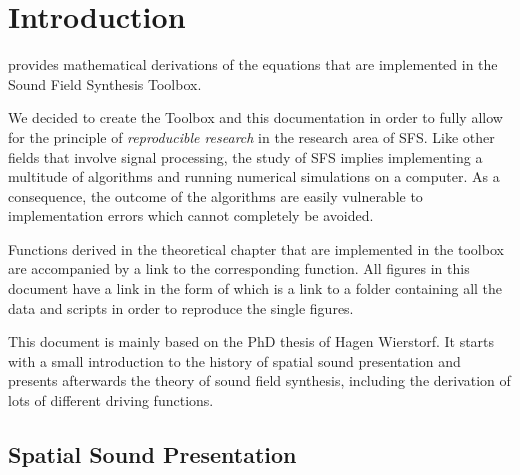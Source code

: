 \def \GITHUB {\GITHUBBASE/01_introduction}
\graphicspath{%
{\PATH/\CHAPONE/}%
{\PATH/\CHAPONE/fig1_01/}%
{\PATH/\CHAPONE/fig1_02/}%
{\PATH/\CHAPONE/fig1_03/}%
{\PATH/\CHAPONE/fig1_04/}%
}

\chapter{Introduction}
\label{cha:introduction}
%
 provides mathematical derivations of the equations that are
implemented in the Sound Field Synthesis Toolbox.

We decided to create the Toolbox and this documentation in order to fully allow
for the principle of \emph{reproducible research} in the research area of \ac{SFS}.
Like other fields that involve signal processing, the study of \ac{SFS}
implies implementing a multitude of algorithms and running numerical simulations
on a computer.
As a consequence, the outcome of the algorithms are easily vulnerable to
implementation errors which cannot completely be
avoided.

Functions derived in the theoretical chapter that are implemented in the
toolbox are accompanied by a link to the corresponding function. All figures in
this document have a link in the form of \reproduce{\GITHUBBASE} which is a link to a
folder containing all the data and scripts in order to reproduce the single
figures.

This document is mainly based on the PhD thesis of Hagen
Wierstorf.\autocite{Wierstorf2014} It starts with a small introduction to the
history of spatial sound presentation and presents afterwards the theory of
sound field synthesis, including the derivation of lots of different driving
functions.


\section{Spatial Sound Presentation}

